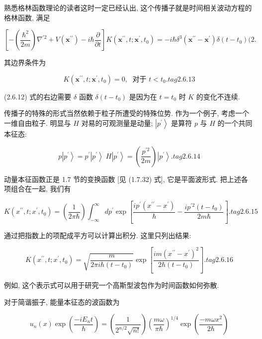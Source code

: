 \documentclass[lang=cn,newtx,10pt,scheme=chinese,thmcnt=section]{elegantbook}
\begin{document}
熟悉格林函数理论的读者这时一定已经认出, 这个传播子就是时间相关波动方程的格林函数, 满足

$$
\left\lbrack {-\left( \frac{{\hbar }^{2}}{2m}\right) {\nabla }^{\prime 2} + V\left( {\mathbf{x}}^{\prime \prime }\right) - i\hbar \frac{\partial }{\partial t}}\right\rbrack K\left( {{\mathbf{x}}^{\prime \prime }, t;{\mathbf{x}}^{\prime },{t}_{0}}\right) = - i\hbar {\delta }^{3}\left( {{\mathbf{x}}^{\prime \prime } - {\mathbf{x}}^{\prime }}\right) \delta \left( {t - {t}_{0}}\right) (2.
$$

其边界条件为

$$
K\left( {{\mathbf{x}}^{\prime \prime }, t;{\mathbf{x}}^{\prime },{t}_{0}}\right) = 0,\;\text{ 对于 }t < {t}_{0}. tag{2.6.13}
$$

(2.6.12) 式的右边需要 $\delta$ 函数 $\delta \left( {t - {t}_{0}}\right)$ 是因为在 $t = {t}_{0}$ 时 $K$ 的变化不连续.

传播子的特殊的形式当然依赖于粒子所遭受的特殊位势. 作为一个例子, 考虑一个一维自由粒子. 明显与 $H$ 对易的可观测量是动量; $\left| {p}^{\prime }\right\rangle$ 是算符 $p$ 与 $H$ 的一个共同本征态:

$$
p\left| {p}^{\prime }\right\rangle = {p}^{\prime }\left| {p}^{\prime }\right\rangle \;H\left| {p}^{\prime }\right\rangle = \left( \frac{{p}^{\prime 2}}{2m}\right) \left| {p}^{\prime }\right\rangle . tag{2. 6.14}
$$

动量本征函数正是 1.7 节的变换函数 [见 (1.7.32) 式], 它是平面波形式. 把上述各项组合在一起, 我们有

$$
K\left( {{x}^{\prime \prime }, t;{x}^{\prime },{t}_{0}}\right) = \left( \frac{1}{{2\pi }\hbar }\right) \int_{-\infty }^{\infty }d{p}^{\prime }\exp \left\lbrack {\frac{i{p}^{\prime }\left( {{x}^{\prime \prime } - {x}^{\prime }}\right) }{\hbar } - \frac{i{p}^{\prime 2}\left( {t - {t}_{0}}\right) }{{2m}\hbar }}\right\rbrack . tag{2.6.15}
$$

通过把指数上的项配成平方可以计算出积分. 这里只列出结果:

$$
K\left( {{x}^{\prime \prime }, t;{x}^{\prime },{t}_{0}}\right) = \sqrt{\frac{m}{{2\pi i}\hbar \left( {t - {t}_{0}}\right) }}\exp \left\lbrack \frac{{im}{\left( {x}^{\prime \prime } - {x}^{\prime }\right) }^{2}}{2\hbar \left( {t - {t}_{0}}\right) }\right\rbrack . tag{2.6.16}
$$

例如, 这个表示式可以用于研究一个高斯型波包作为时间函数如何弥散.

对于简谐振子, 能量本征态的波函数为

$$
{u}_{n}\left( x\right) \exp \left( \frac{-i{E}_{n}t}{\hbar }\right) = \left( \frac{1}{{2}^{n/2}\sqrt{n!}}\right) {\left( \frac{m\omega }{\pi \hbar }\right) }^{1/4}\exp \left( \frac{-{m\omega }{x}^{2}}{2\hbar }\right)
$$
\end{document}
